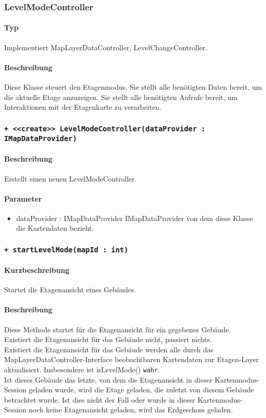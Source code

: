 \subsubsection{LevelModeController}
\paragraph*{Typ}
Implementiert MapLayerDataController, LevelChangeController.
\paragraph*{Beschreibung}
Diese Klasse steuert den Etagenmodus. Sie stellt alle benötigten Daten bereit, um die aktuelle Etage anzuzeigen. 
Sie stellt alle benötigten Aufrufe bereit, um Interaktionen mit der Etagenkarte zu verarbeiten.

\subsubsection*{\texttt{+ <<create>> LevelModeController(dataProvider : IMapDataProvider)}}%
\paragraph*{Beschreibung}
Erstellt einen neuen LevelModeController.
\paragraph*{Parameter}
\begin{itemize}
    \item dataProvider : IMapDataProvider IMapDataProvider von dem diese Klasse die Kartendaten bezieht.
\end{itemize}

\subsubsection*{\texttt{+ startLevelMode(mapId : int)}}%
\paragraph*{Kurzbeschreibung}
Startet die Etagenansicht eines Gebäudes.
\paragraph*{Beschreibung}
Diese Methode startet für die Etagenansicht für ein gegebenes Gebäude.\\
Existiert die Etagenansicht für das Gebäude nicht, passiert nichts.\\
Existiert die Etagenansicht für das Gebäude werden alle durch das MapLayerDataController-Interface beobachtbaren 
Kartendaten zur Etagen-Layer aktualisiert. Insbesondere ist isLevelMode() \texttt{wahr}.\\
Ist dieses Gebäude das letzte, von dem die Etagenansicht in dieser Kartenmodus-Session geladen wurde, wird die 
Etage geladen, die zuletzt von diesem Gebäude betrachtet wurde.
Ist dies nicht der Fall oder wurde in dieser Kartenmodus-Session noch keine Etagenansicht geladen, wird das Erdgeschoss geladen.
